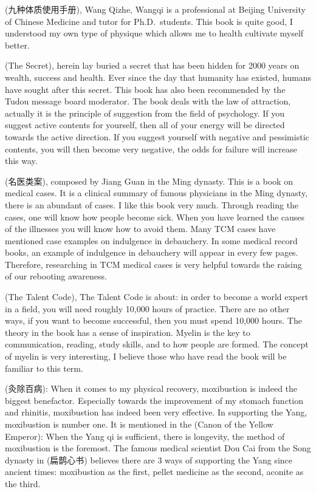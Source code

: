 \documentclass[
]{book}
\begin{document}
(九种体质使用手册), Wang Qizhe, Wangqi is a professional at Beijing University of Chinese Medicine and tutor for Ph.D.~students. This book is quite good, I understood my own type of physique which allows me to health cultivate myself better.

(The Secret), herein lay buried a secret that has been hidden for 2000 years on wealth, success and health. Ever since the day that humanity has existed, humans have sought after this secret. This book has also been recommended by the Tudou message board moderator. The book deals with the law of attraction, actually it is the principle of suggestion from the field of psychology. If you suggest active contents for yourself, then all of your energy will be directed towards the active direction. If you suggest yourself with negative and pessimistic contents, you will then become very negative, the odds for failure will increase this way.

(名医类案), composed by Jiang Guan in the Ming dynasty. This is a book on medical cases. It is a clinical summary of famous physicians in the Ming dynasty, there is an abundant of cases. I like this book very much. Through reading the cases, one will know how people become sick. When you have learned the causes of the illnesses you will know how to avoid them. Many TCM cases have mentioned case examples on indulgence in debauchery. In some medical record books, an example of indulgence in debauchery will appear in every few pages. Therefore, researching in TCM medical cases is very helpful towards the raising of our rebooting awareness.

(The Talent Code), The Talent Code is about: in order to become a world expert in a field, you will need roughly 10,000 hours of practice. There are no other ways, if you want to become successful, then you must spend 10,000 hours. The theory in the book has a sense of inspiration. Myelin is the key to communication, reading, study skills, and to how people are formed. The concept of myelin is very interesting, I believe those who have read the book will be familiar to this term.

(灸除百病): When it comes to my physical recovery, moxibustion is indeed the biggest benefactor. Especially towards the improvement of my stomach function and rhinitis, moxibustion has indeed been very effective. In supporting the Yang, moxibustion is number one. It is mentioned in the (Canon of the Yellow Emperor): When the Yang qi is sufficient, there is longevity, the method of moxibustion is the foremost. The famous medical scientist Dou Cai from the Song dynasty in (扁鹊心书) believes there are 3 ways of supporting the Yang since ancient times: moxibustion as the first, pellet medicine as the second, aconite as the third.
\end{document}
